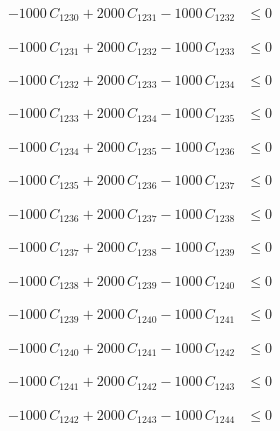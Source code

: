 \documentclass[a4paper,11pt]{article}
\begin{document}
\begin{align}
-1000\,C_{1230} + 2000\,C_{1231} - 1000\,C_{1232} &\leq 0 \nonumber
\end{align}

\begin{align}
-1000\,C_{1231} + 2000\,C_{1232} - 1000\,C_{1233} &\leq 0 \nonumber
\end{align}

\begin{align}
-1000\,C_{1232} + 2000\,C_{1233} - 1000\,C_{1234} &\leq 0 \nonumber
\end{align}

\begin{align}
-1000\,C_{1233} + 2000\,C_{1234} - 1000\,C_{1235} &\leq 0 \nonumber
\end{align}

\begin{align}
-1000\,C_{1234} + 2000\,C_{1235} - 1000\,C_{1236} &\leq 0 \nonumber
\end{align}

\begin{align}
-1000\,C_{1235} + 2000\,C_{1236} - 1000\,C_{1237} &\leq 0 \nonumber
\end{align}

\begin{align}
-1000\,C_{1236} + 2000\,C_{1237} - 1000\,C_{1238} &\leq 0 \nonumber
\end{align}

\begin{align}
-1000\,C_{1237} + 2000\,C_{1238} - 1000\,C_{1239} &\leq 0 \nonumber
\end{align}

\begin{align}
-1000\,C_{1238} + 2000\,C_{1239} - 1000\,C_{1240} &\leq 0 \nonumber
\end{align}

\begin{align}
-1000\,C_{1239} + 2000\,C_{1240} - 1000\,C_{1241} &\leq 0 \nonumber
\end{align}

\begin{align}
-1000\,C_{1240} + 2000\,C_{1241} - 1000\,C_{1242} &\leq 0 \nonumber
\end{align}

\begin{align}
-1000\,C_{1241} + 2000\,C_{1242} - 1000\,C_{1243} &\leq 0 \nonumber
\end{align}

\begin{align}
-1000\,C_{1242} + 2000\,C_{1243} - 1000\,C_{1244} &\leq 0 \nonumber
\end{align}
\end{document}
